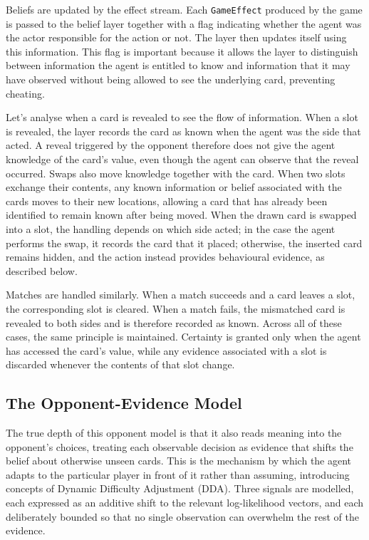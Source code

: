 \documentclass[12pt,a4paper,oneside]{report}
\begin{document}
Beliefs are updated by the effect stream. Each \texttt{GameEffect} produced by the game is passed to the belief layer together with a flag indicating whether the agent was the actor responsible for the action or not. The layer then updates itself using this information. This flag is important because it allows the layer to distinguish between information the agent is entitled to know and information that it may have observed without being allowed to see the underlying card, preventing cheating.

Let's analyse when a card is revealed to see the flow of information. When a slot is revealed, the layer records the card as known when the agent was the side that acted. A reveal triggered by the opponent therefore does not give the agent knowledge of the card's value, even though the agent can observe that the reveal occurred. Swaps also move knowledge together with the card. When two slots exchange their contents, any known information or belief associated with the cards moves to their new locations, allowing a card that has already been identified to remain known after being moved. When the drawn card is swapped into a slot, the handling depends on which side acted; in the case the agent performs the swap, it records the card that it placed; otherwise, the inserted card remains hidden, and the action instead provides behavioural evidence, as described below.

Matches are handled similarly. When a match succeeds and a card leaves a slot, the corresponding slot is cleared. When a match fails, the mismatched card is revealed to both sides and is therefore recorded as known. Across all of these cases, the same principle is maintained. Certainty is granted only when the agent has accessed the card's value, while any evidence associated with a slot is discarded whenever the contents of that slot change. 

\subsection{The Opponent-Evidence Model}

The true depth of this opponent model is that it also reads meaning into the opponent's choices, treating
each observable decision as evidence that shifts the belief about otherwise unseen cards.
This is the mechanism by which the agent adapts to the particular player in front of it
rather than assuming, introducing concepts of Dynamic Difficulty Adjustment (DDA). Three signals are modelled, each expressed as an additive shift to the
relevant log-likelihood vectors, and each deliberately bounded so that no single observation can overwhelm the rest of the evidence.
\end{document}
